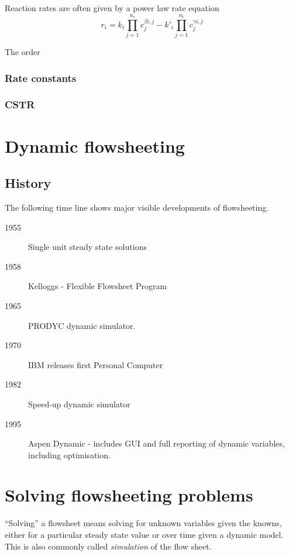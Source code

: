 Reaction rates are often given by a power law rate equation
\begin{equation}
  r_i = k_i \prod_{j=1}^{n_c}c_j^{\beta{i,j}} - k'_i\prod_{j=1}^{n_c}c_j^{\gamma{i,j}}
\end{equation}

The order 

\subsubsection{Rate constants}

\subsubsection{CSTR}


\section{Dynamic flowsheeting}
\subsection{History}
The following time line shows major visible developments of
flowsheeting. \cite{husain1986chemical,mallja2000}
\begin{description}
\item[1955] Single unit steady state solutions 
\item[1958] Kelloggs - Flexible Flowsheet Program 
\item[1965] PRODYC dynamic simulator. 
\item[1970] IBM releases  first Personal Computer 
\item[1982] Speed-up dynamic simulator 
\item[1995] Aspen  Dynamic - includes GUI and full reporting of dynamic variables, including optimisation.
\end{description}

\section{Solving flowsheeting problems}
``Solving'' a flowsheet means solving for unknown variables given the knowns, either for a particular steady state value or over time given a dynamic model.  
This is also commonly called \emph{simulation} of the flow sheet.

